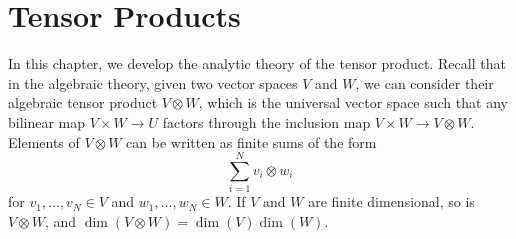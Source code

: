 \chapter{Tensor Products}

In this chapter, we develop the analytic theory of the tensor product. Recall that in the algebraic theory, given two vector spaces $V$ and $W$, we can consider their algebraic tensor product $V \otimes W$, which is the universal vector space such that any bilinear map $V \times W \to U$ factors through the inclusion map $V \times W \to V \otimes W$. Elements of $V \otimes W$ can be written as finite sums of the form
%
\[ \sum_{i=1}^N v_i \otimes w_i \]
%
for $v_1,\dots,v_N \in V$ and $w_1,\dots,w_N \in W$. If $V$ and $W$ are finite dimensional, so is $V \otimes W$, and $\dim(V \otimes W) = \dim(V) \dim(W)$.

